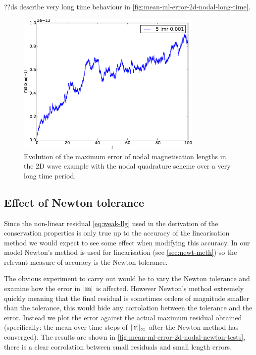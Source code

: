 ??ds describe very long time behaviour in \autoref{fig:mean-ml-error-2d-nodal-long-time}.

\begin{figure}[\figpos]
  \centering
\includegraphics[width=0.8\textwidth]{plots/2d_wave_solution_m_length_long_time/-maxmathbfm-1vst.pdf}
\caption{Evolution of the maximum error of nodal magnetisation lengths in the 2D wave example with the nodal quadrature scheme over a very long time period.}
\label{fig:mean-ml-error-2d-nodal-long-time}
\end{figure}



\subsection{Effect of Newton tolerance}
\label{sec:effect-newt-toler-m-conservation}

Since the non-linear residual \eqref{eq:weak-llg} used in the derivation of the conservation properties is only true up to the accuracy of the linearisation method we would expect to see some effect when modifying this accuracy.
In our model Newton's method is used for linearisation (see \autoref{sec:newt-meth}) so the relevant measure of accuracy is the Newton tolerance.

The obvious experiment to carry out would be to vary the Newton tolerance and examine how the error in $\left|{\mathbf{m}} \right|$ is affected.
However Newton's method extremely quickly meaning that the final residual is sometimes orders of magnitude smaller than the tolerance, this would hide any corrolation between the tolerance and the error.
Instead we plot the error against the actual maximum residual obtained (specifically: the mean over time steps of $\lVert \mathbf{r} \rVert_\infty$ after the Newton method has converged). 
The results are shown in \autoref{fig:mean-ml-error-2d-nodal-newton-tests}, there is a clear corrolation between small residuals and small length errors.


